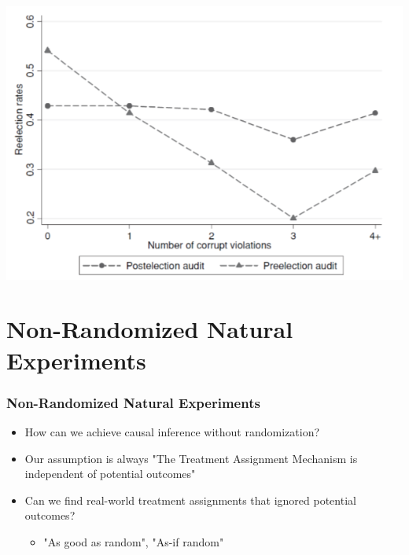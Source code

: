 \documentclass[xcolor=x11names,compress]{beamer}\usepackage[]{graphicx}\usepackage[]{color}
\renewcommand{\(}{\begin{columns}}
\renewcommand{\)}{\end{columns}}
\newcommand{\<}[1]{\begin{column}{#1}}
\renewcommand{\>}{\end{column}}
\begin{document}
\begin{frame}
\begin{center}
\includegraphics[scale=0.45]{Chart_FF.png}
\end{center}
\end{frame}

\section{Non-Randomized Natural Experiments}

\begin{frame}
\frametitle{Non-Randomized Natural Experiments}
\begin{itemize}
\item How can we achieve causal inference without randomization?
\pause
\item Our assumption is always "The Treatment Assignment Mechanism is independent of potential outcomes"
\pause
\item Can we find real-world treatment assignments that ignored potential outcomes?
\begin{itemize}
\pause
\item "As good as random", "As-if random"
\end{itemize}
\end{itemize}
\end{frame}
\end{document}
